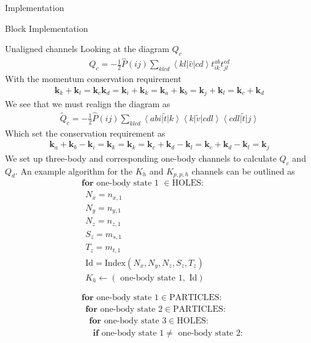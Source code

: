 \documentclass[twoside,english]{uiofysmaster}
\begin{document}
\begin{chapter}{Implementation}
\begin{section}{Block Implementation}
\begin{subsection}{Unaligned channels}
			Looking at the diagram $Q_c$
			\begin{align}
				Q_c = -\frac{1}{2} \hat P(ij) \sum_{klcd} \left<kl|\hat v|cd\right> t_{ik}^{ab} t_{jl}^{cd}
			\end{align}
			With the momentum conservation requirement
			\begin{align}
				\mathbf{k}_k + \mathbf{k}_l = \mathbf{k}_c \mathbf{k}_d = \mathbf{k}_i + \mathbf{k}_k = \mathbf{k}_a + \mathbf{k}_b = \mathbf{k}_j + \mathbf{k}_l = \mathbf{k}_c + \mathbf{k}_d
			\end{align}
			We see that we must realign the diagram as
			\begin{align}
				\tilde Q_c = -\frac{1}{2} \hat P(ij) \sum_{klcd} \left<abi\right|\tilde t\left|k\right> \left<k\right|\tilde v\left|cdl\right> \left<cdl\right|\tilde t\left|j\right>
			\end{align}
			Which set the conservation requirement as 
			\begin{align}
				\mathbf{k}_a + \mathbf{k}_b	- \mathbf{k}_i = \mathbf{k}_k = \mathbf{k}_k = \mathbf{k}_c + \mathbf{k}_d - \mathbf{k}_l = \mathbf{k}_c + \mathbf{k}_d - \mathbf{k}_l = \mathbf{k}_j
			\end{align}
			We set up three-body and corresponding one-body channels to calculate $Q_c$ and $Q_d$. An example algorithm for the $K_h$ and $K_{p,p,h}$ channels can be outlined as
			\begin{align*}
				&\mathbf{for } \text{ one-body state 1 } \in \text{HOLES}:\\
				&\:\: N_x = n_{x,1}\\
				&\:\: N_y = n_{y,1}\\
				&\:\: N_z = n_{z,1}\\
 				&\:\: S_z = m_{s,1}\\
				&\:\: T_z = m_{t,1}\\
				&\:\: \text{Id} = \text{Index}(N_x,N_y,N_z,S_z,T_z) \\
				&\:\: K_h \leftarrow (\text{ one-body state 1}, \text{ Id}) \\ \\ \\ 
				&\mathbf{for } \text{ one-body state 1} \in \text{PARTICLES}: \\
				&\:\: \mathbf{for } \text{ one-body state 2} \in \text{PARTICLES}: \\
				&\:\:\:\: \mathbf{for } \text{ one-body state 3} \in \text{HOLES}: \\
				&\:\:\:\:\:\: \mathbf{if} \text{ one-body state 1} \neq \text{ one-body state 2}: \\

\end{align*}
\end{subsection}
\end{section}
\end{chapter}
\end{document}
